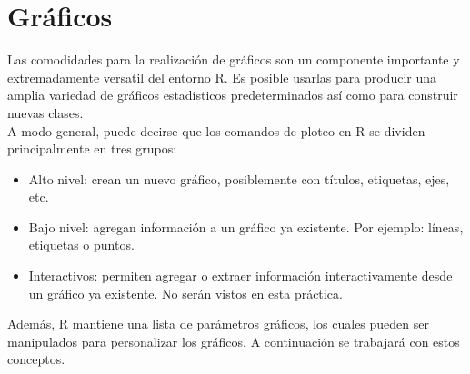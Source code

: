 \documentclass{../prob}
\begin{document}
\section*{Gráficos}
Las comodidades para la realización de gráficos son un componente importante y extremadamente versatil del entorno R. Es posible usarlas para producir una amplia variedad de gráficos estadísticos predeterminados así como para construir nuevas clases.\\
A modo general, puede decirse que los comandos de ploteo en R se dividen principalmente en tres grupos:
\begin{itemize}
	\item Alto nivel: crean un nuevo gráfico, posiblemente con títulos, etiquetas, ejes, etc.
	\item Bajo nivel: agregan información a un gráfico ya existente. Por ejemplo: líneas, etiquetas o puntos.
	\item Interactivos: permiten agregar o extraer información interactivamente desde un gráfico ya existente. No serán vistos en esta práctica.
\end{itemize}
Además, R mantiene una lista de parámetros gráficos, los cuales pueden ser manipulados para personalizar los gráficos. A continuación se trabajará con estos conceptos.
\end{document}
